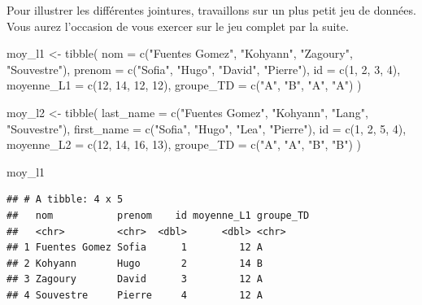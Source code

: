 \documentclass[
  11pt,
]{book}
\newenvironment{Shaded}{\begin{snugshade}}{\end{snugshade}}
\newcommand{\AttributeTok}[1]{\textcolor[rgb]{0.77,0.63,0.00}{#1}}
\newcommand{\DecValTok}[1]{\textcolor[rgb]{0.00,0.00,0.81}{#1}}
\newcommand{\FunctionTok}[1]{\textcolor[rgb]{0.00,0.00,0.00}{#1}}
\newcommand{\NormalTok}[1]{#1}
\newcommand{\OtherTok}[1]{\textcolor[rgb]{0.56,0.35,0.01}{#1}}
\newcommand{\StringTok}[1]{\textcolor[rgb]{0.31,0.60,0.02}{#1}}
\numberwithin{equation}{section}
\numberwithin{countremarque}{section}
\begin{document}
Pour illustrer les différentes jointures, travaillons sur un plus petit jeu de données. Vous aurez l'occasion de vous exercer sur le jeu complet par la suite.

\begin{Shaded}
\begin{Highlighting}[]
\NormalTok{moy\_l1 }\OtherTok{\textless{}{-}} \FunctionTok{tibble}\NormalTok{(}
  \AttributeTok{nom =} \FunctionTok{c}\NormalTok{(}\StringTok{"Fuentes Gomez"}\NormalTok{, }\StringTok{"Kohyann"}\NormalTok{, }\StringTok{"Zagoury"}\NormalTok{, }\StringTok{"Souvestre"}\NormalTok{),}
  \AttributeTok{prenom =} \FunctionTok{c}\NormalTok{(}\StringTok{"Sofia"}\NormalTok{, }\StringTok{"Hugo"}\NormalTok{, }\StringTok{"David"}\NormalTok{, }\StringTok{"Pierre"}\NormalTok{),}
  \AttributeTok{id =} \FunctionTok{c}\NormalTok{(}\DecValTok{1}\NormalTok{, }\DecValTok{2}\NormalTok{, }\DecValTok{3}\NormalTok{, }\DecValTok{4}\NormalTok{),}
  \AttributeTok{moyenne\_L1 =} \FunctionTok{c}\NormalTok{(}\DecValTok{12}\NormalTok{, }\DecValTok{14}\NormalTok{, }\DecValTok{12}\NormalTok{, }\DecValTok{12}\NormalTok{),}
  \AttributeTok{groupe\_TD =} \FunctionTok{c}\NormalTok{(}\StringTok{"A"}\NormalTok{, }\StringTok{"B"}\NormalTok{, }\StringTok{"A"}\NormalTok{, }\StringTok{"A"}\NormalTok{)}
\NormalTok{)}

\NormalTok{moy\_l2 }\OtherTok{\textless{}{-}} \FunctionTok{tibble}\NormalTok{(}
  \AttributeTok{last\_name =} \FunctionTok{c}\NormalTok{(}\StringTok{"Fuentes Gomez"}\NormalTok{, }\StringTok{"Kohyann"}\NormalTok{, }\StringTok{"Lang"}\NormalTok{, }\StringTok{"Souvestre"}\NormalTok{),}
  \AttributeTok{first\_name =} \FunctionTok{c}\NormalTok{(}\StringTok{"Sofia"}\NormalTok{, }\StringTok{"Hugo"}\NormalTok{, }\StringTok{"Lea"}\NormalTok{, }\StringTok{"Pierre"}\NormalTok{),}
  \AttributeTok{id =} \FunctionTok{c}\NormalTok{(}\DecValTok{1}\NormalTok{, }\DecValTok{2}\NormalTok{, }\DecValTok{5}\NormalTok{, }\DecValTok{4}\NormalTok{),}
  \AttributeTok{moyenne\_L2 =} \FunctionTok{c}\NormalTok{(}\DecValTok{12}\NormalTok{, }\DecValTok{14}\NormalTok{, }\DecValTok{16}\NormalTok{, }\DecValTok{13}\NormalTok{),}
  \AttributeTok{groupe\_TD =} \FunctionTok{c}\NormalTok{(}\StringTok{"A"}\NormalTok{, }\StringTok{"A"}\NormalTok{, }\StringTok{"B"}\NormalTok{, }\StringTok{"B"}\NormalTok{)}
\NormalTok{)}

\NormalTok{moy\_l1}
\end{Highlighting}
\end{Shaded}

\begin{lstlisting}
## # A tibble: 4 x 5
##   nom           prenom    id moyenne_L1 groupe_TD
##   <chr>         <chr>  <dbl>      <dbl> <chr>    
## 1 Fuentes Gomez Sofia      1         12 A        
## 2 Kohyann       Hugo       2         14 B        
## 3 Zagoury       David      3         12 A        
## 4 Souvestre     Pierre     4         12 A
\end{lstlisting}
\end{document}
